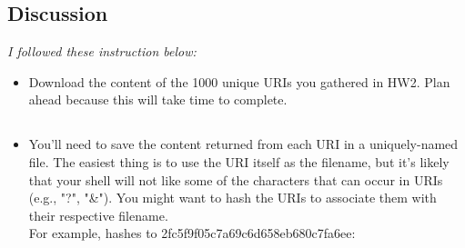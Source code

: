\documentclass[12pt]{article}
\begin{document}
\subsection*{Discussion}
\emph{I followed these instruction below:}
    \begin{itemize}
        \item Download the content of the 1000 unique URIs you gathered in HW2. Plan ahead because this will take time to complete.
        \subsection*{\color{blue}{Answer}}
            
            
        \item You'll need to save the content returned from each URI in a uniquely-named file. The easiest thing is to use the URI itself as the filename, but it's likely that your shell will not like some of the characters that can occur in URIs (e.g., "?", "\&"). You might want to hash the URIs to associate them with their respective filename. \\ For example,  \href{https://www.cnn.com/world/live-news/nasa-mars-rover-landing-02-18-21}{ \color{red}{https://www.cnn.com/world/live-news/nasa-mars-rover-landing-02-18-21}} hashes to 2fc5f9f05c7a69c6d658eb680c7fa6ee:
        \subsection*{\color{blue}{Answer}}
        
        

\end{itemize}
\end{document}
